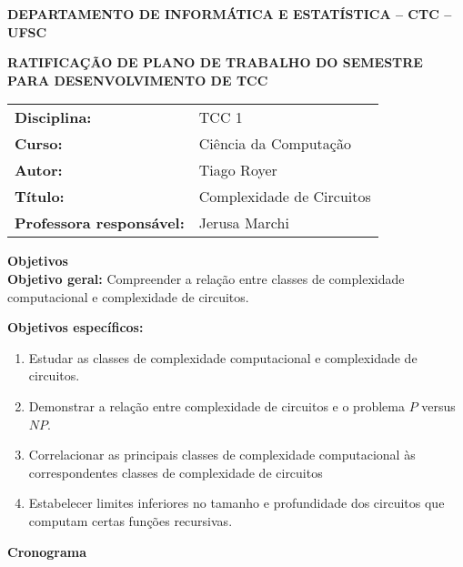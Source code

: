 \documentclass[12pt]{letter}
\begin{document}
\pagestyle{empty}

\begin{centering}

    \textbf{DEPARTAMENTO DE INFORMÁTICA E ESTATÍSTICA -- CTC -- UFSC}

    \textbf{RATIFICAÇÃO DE PLANO DE TRABALHO DO SEMESTRE \\ PARA DESENVOLVIMENTO DE TCC}

\end{centering}


\vspace{1em}
\setlength\extrarowheight{5pt}
\begin{tabular}{l l}
    \textbf{Disciplina:} & TCC 1 \\
    \textbf{Curso:}      & Ciência da Computação \\
    \textbf{Autor:}      & Tiago Royer \\
    \textbf{Título:}     & Complexidade de Circuitos \\
    \textbf{Professora responsável:} & Jerusa Marchi \\
\end{tabular}


\vspace{1em}
{\large \textbf{Objetivos}}
\\

\textbf{Objetivo geral:}
Compreender a relação entre classes de complexidade computacional
e complexidade de circuitos.

\textbf{Objetivos específicos:}
\begin{enumerate}
    \item Estudar as classes de complexidade computacional
        e complexidade de circuitos.
    \item Demonstrar a relação entre complexidade de circuitos
        e o problema $P$ versus $NP$.
    \item Correlacionar as principais classes de complexidade computacional
        às correspondentes classes de complexidade de circuitos
    \item Estabelecer limites inferiores no tamanho e profundidade dos circuitos
        que computam certas funções recursivas.
\end{enumerate}


\vspace{1em}
{\large \textbf{Cronograma}}
\end{document}
